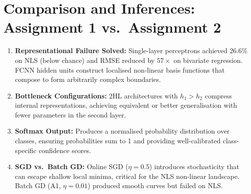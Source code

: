 \documentclass[11pt,a4paper]{article}
\begin{document}
\section{Comparison and Inferences: Assignment 1 vs.\ Assignment 2}

\begin{enumerate}
    \item \textbf{Representational Failure Solved:} Single-layer perceptrons achieved 26.6\% on NLS (below chance) and RMSE reduced by $57\times$ on bivariate regression. FCNN hidden units construct localised non-linear basis functions that compose to form arbitrarily complex boundaries.
    \item \textbf{Bottleneck Configurations:} 2HL architectures with $h_1>h_2$ compress internal representations, achieving equivalent or better generalisation with fewer parameters in the second layer.
    \item \textbf{Softmax Output:} Produces a normalised probability distribution over classes, ensuring probabilities sum to 1 and providing well-calibrated class-specific confidence scores.
    \item \textbf{SGD vs.\ Batch GD:} Online SGD ($\eta=0.5$) introduces stochasticity that can escape shallow local minima, critical for the NLS non-linear landscape. Batch GD (A1, $\eta=0.01$) produced smooth curves but failed on NLS.
\end{enumerate}

\end{document}
